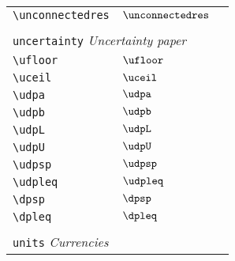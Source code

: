 \begin{longtable}{lll}
  {\color[rgb]{0.5,0.5,0.5}\texttt{\textbackslash unconnectedres}}                                          & $\unconnectedres$
  &
  \\
  &                            &                                                         \\
  \multicolumn{3}{l}{{\color[rgb]{0.5,0.5,0.5}\texttt{uncertainty}} \emph{Uncertainty paper}}
  \\
  \hline
  \hline
  {\color[rgb]{0.5,0.5,0.5}\texttt{\textbackslash ufloor}}                                                  & $\ufloor$                  & \\
  {\color[rgb]{0.5,0.5,0.5}\texttt{\textbackslash uceil}}                                                   & $\uceil$                   & \\
  {\color[rgb]{0.5,0.5,0.5}\texttt{\textbackslash udpa}}                                                    & $\udpa$                    & \\
  {\color[rgb]{0.5,0.5,0.5}\texttt{\textbackslash udpb}}                                                    & $\udpb$                    & \\
  {\color[rgb]{0.5,0.5,0.5}\texttt{\textbackslash udpL}}                                                    & $\udpL$                    & \\
  {\color[rgb]{0.5,0.5,0.5}\texttt{\textbackslash udpU}}                                                    & $\udpU$                    & \\
  {\color[rgb]{0.5,0.5,0.5}\texttt{\textbackslash udpsp}}                                                   & $\udpsp$                   & \\
  {\color[rgb]{0.5,0.5,0.5}\texttt{\textbackslash udpleq}}                                                  & $\udpleq$                  & \\
  {\color[rgb]{0.5,0.5,0.5}\texttt{\textbackslash dpsp}}                                                    & $\dpsp$                    & \\
  {\color[rgb]{0.5,0.5,0.5}\texttt{\textbackslash dpleq}}                                                   & $\dpleq$                   &                                                         \\
  &                            &                                                         \\
  \multicolumn{3}{l}{{\color[rgb]{0.5,0.5,0.5}\texttt{units}} \emph{Currencies}} \\
  \hline

\end{longtable}
